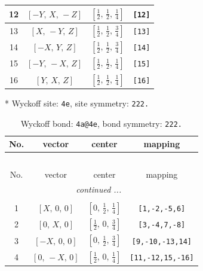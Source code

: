 \documentclass[fleqn,8pt]{jsarticle}
\begin{document}
\begin{longtable}{cccc}
12 & $\left[ - Y,\, X,\, - Z \right]$ & $\left[ \frac{1}{2},\, \frac{1}{2},\, \frac{1}{4} \right]$ & {\tt [12]} \\ \hline
13 & $\left[ X,\, - Y,\, Z \right]$ & $\left[ \frac{1}{2},\, \frac{1}{2},\, \frac{3}{4} \right]$ & {\tt [13]} \\ \hline
14 & $\left[ - X,\, Y,\, Z \right]$ & $\left[ \frac{1}{2},\, \frac{1}{2},\, \frac{3}{4} \right]$ & {\tt [14]} \\ \hline
15 & $\left[ - Y,\, - X,\, Z \right]$ & $\left[ \frac{1}{2},\, \frac{1}{2},\, \frac{1}{4} \right]$ & {\tt [15]} \\ \hline
16 & $\left[ Y,\, X,\, Z \right]$ & $\left[ \frac{1}{2},\, \frac{1}{2},\, \frac{1}{4} \right]$ & {\tt [16]} \\
\end{longtable}
* Wyckoff site: {\tt 4e}, site symmetry: {\tt 222.}
\renewcommand{\arraystretch}{1.2}
\begin{longtable}{cccc}
\caption{Wyckoff bond: {\tt 4a@4e}, bond symmetry: {\tt 222.}}
 \\
 \hline \hline
No. & vector & center & mapping \\ \hline \endfirsthead

\multicolumn{3}{l}{\tablename\ \thetable{}} \\
 \hline \hline
No. & vector & center & mapping \\ \hline \endhead

 \hline \hline
\multicolumn{3}{r}{\footnotesize\it continued ...} \\ \endfoot

 \hline \hline
\multicolumn{3}{r}{} \\ \endlastfoot

1 & $\left[ X,\, 0,\, 0 \right]$ & $\left[ 0,\, \frac{1}{2},\, \frac{1}{4} \right]$ & {\tt [1,-2,-5,6]} \\ \hline
2 & $\left[ 0,\, X,\, 0 \right]$ & $\left[ \frac{1}{2},\, 0,\, \frac{3}{4} \right]$ & {\tt [3,-4,7,-8]} \\ \hline
3 & $\left[ - X,\, 0,\, 0 \right]$ & $\left[ 0,\, \frac{1}{2},\, \frac{3}{4} \right]$ & {\tt [9,-10,-13,14]} \\ \hline
4 & $\left[ 0,\, - X,\, 0 \right]$ & $\left[ \frac{1}{2},\, 0,\, \frac{1}{4} \right]$ & {\tt [11,-12,15,-16]} \\
\end{longtable}
\renewcommand{\arraystretch}{1.2}
\end{document}
